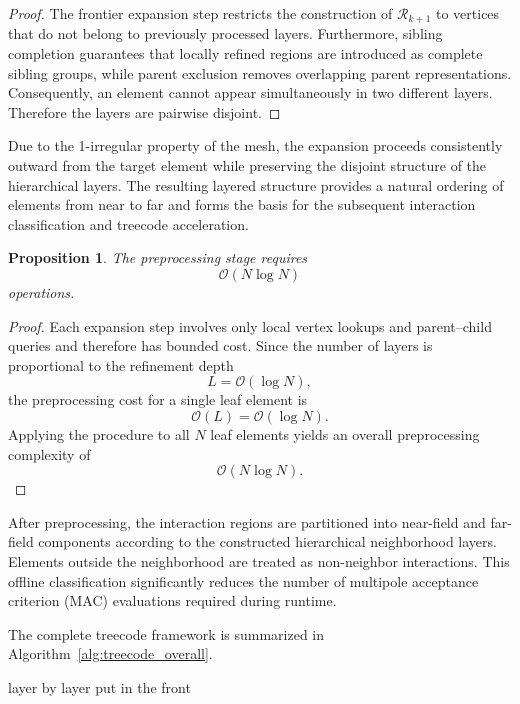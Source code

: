 \documentclass[a4paper,10pt]{article}
\newtheorem{proposition}{Proposition}
\begin{document}
\begin{proof}
The frontier expansion step restricts the construction of
$\mathcal{R}_{k+1}$ to vertices that do not belong to previously
processed layers. Furthermore, sibling completion guarantees that
locally refined regions are introduced as complete sibling groups,
while parent exclusion removes overlapping parent representations.
Consequently, an element cannot appear simultaneously in two different
layers. Therefore the layers are pairwise disjoint.
\end{proof}

Due to the 1-irregular property of the mesh, the expansion proceeds
consistently outward from the target element while preserving the
disjoint structure of the hierarchical layers. The resulting layered
structure provides a natural ordering of elements from near to far and
forms the basis for the subsequent interaction classification and
treecode acceleration.

\begin{proposition}
The preprocessing stage requires
\[
\mathcal{O}(N\log N)
\]
operations.
\end{proposition}

\begin{proof}
Each expansion step involves only local vertex lookups and
parent--child queries and therefore has bounded cost.
Since the number of layers is proportional to the refinement depth
\[
L=\mathcal{O}(\log N),
\]
the preprocessing cost for a single leaf element is
\[
\mathcal{O}(L)=\mathcal{O}(\log N).
\]
Applying the procedure to all $N$ leaf elements yields an overall
preprocessing complexity of
\[
\mathcal{O}(N\log N).
\]
\end{proof}

After preprocessing, the interaction regions are partitioned into
near-field and far-field components according to the constructed
hierarchical neighborhood layers. Elements outside the neighborhood
are treated as non-neighbor interactions. This offline classification
significantly reduces the number of multipole acceptance criterion
(MAC) evaluations required during runtime.


The complete treecode framework is summarized in
Algorithm~\ref{alg:treecode_overall}.

{\color{red} layer by layer put in the front}
\end{document}
